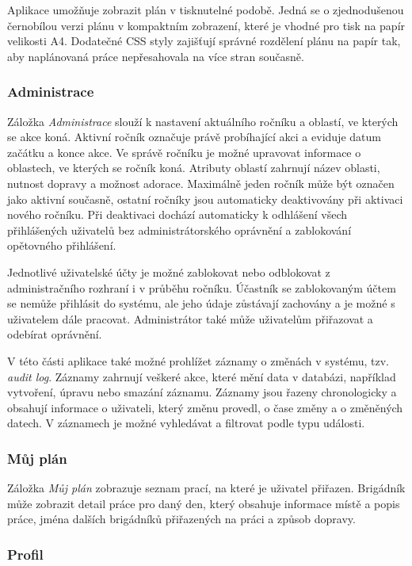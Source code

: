 Aplikace umožňuje zobrazit plán v tisknutelné podobě. Jedná se o zjednodušenou černobílou verzi plánu v kompaktním zobrazení, které je vhodné pro tisk na 
papír velikosti A4. Dodatečné CSS styly zajišťují správné rozdělení plánu na papír tak, aby naplánovaná práce nepřesahovala na více stran současně.

\subsubsection{Administrace}

Záložka \textit{Administrace} slouží k nastavení aktuálního ročníku a oblastí, ve kterých se akce koná. Aktivní ročník
označuje právě probíhající akci a eviduje datum začátku a konce akce. Ve správě ročníku je možné upravovat informace o oblastech, ve kterých
se ročník koná. Atributy oblastí zahrnují název oblasti, nutnost dopravy a možnost adorace. Maximálně jeden ročník může být označen jako
aktivní současně, ostatní ročníky jsou automaticky deaktivovány při aktivaci nového ročníku. Při deaktivaci dochází automaticky 
k odhlášení všech přihlášených uživatelů bez administrátorského oprávnění a zablokování opětovného přihlášení.

Jednotlivé uživatelské účty je možné zablokovat nebo odblokovat z administračního rozhraní i v průběhu ročníku. Účastník se zablokovaným účtem
se nemůže přihlásit do systému, ale jeho údaje zůstávají zachovány a je možné s uživatelem dále pracovat. Administrátor také může uživatelům
přiřazovat a odebírat oprávnění.

V této části aplikace také možné prohlížet záznamy o změnách v systému, tzv. \textit{audit log}. Záznamy zahrnují veškeré akce, které mění data v databázi,
například vytvoření, úpravu nebo smazání záznamu. Záznamy jsou řazeny chronologicky a obsahují informace o uživateli, který změnu provedl,
o čase změny a o změněných datech. V záznamech je možné vyhledávat a filtrovat podle typu události.

\subsubsection{Můj plán}

Záložka \textit{Můj plán} zobrazuje seznam prací, na které je uživatel přiřazen. Brigádník může zobrazit detail práce pro daný den,
který obsahuje informace místě a popis práce, jména dalších brigádníků přiřazených na práci a způsob dopravy.

\subsubsection{Profil}

